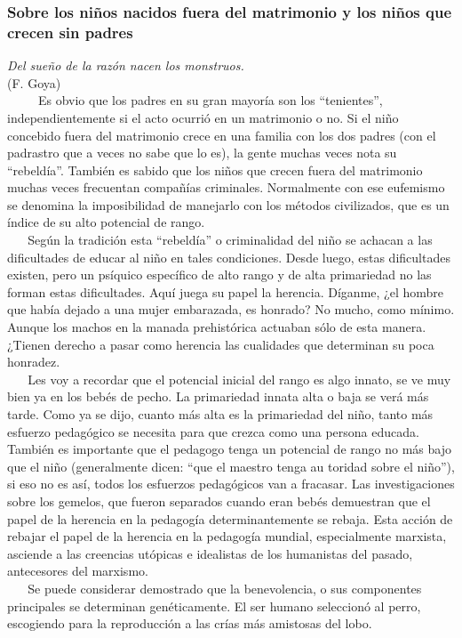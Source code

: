 \protect\hypertarget{M13}{}{}

\subsubsection{Sobre los niños nacidos fuera del matrimonio y los niños que crecen sin padres}
\label{sobre-los-niuxf1os-nacidos-fuera-del-matrimonio-y-los-niuxf1os-que-crecen-sin-padres}

\noindent
\textit{Del sueño de la razón nacen los monstruos.}\\
(F. Goya)\\

~ ~ ~ Es obvio que los padres en su gran mayoría son los ``tenientes'',
independientemente si el acto ocurrió en un matrimonio o no. Si el niño
concebido fuera del matrimonio crece en una familia con los dos padres
(con el padrastro que a veces no sabe que lo es), la gente muchas veces
nota su ``rebeldía''. También es sabido que los niños que crecen fuera
del matrimonio muchas veces frecuentan compañías criminales. Normalmente
con ese eufemismo se denomina la imposibilidad de manejarlo con los
métodos civilizados, que es un índice de su alto potencial de rango.\\
\hspace*{0.333em} ~ ~ Según la tradición esta ``rebeldía'' o
criminalidad del niño se achacan a las dificultades de educar al niño en
tales condiciones. Desde luego, estas dificultades existen, pero un
psíquico específico de alto rango y de alta primariedad no las forman
estas dificultades. Aquí juega su papel la herencia. Díganme, ¿el hombre
que había dejado a una mujer embarazada, es honrado? No mucho, como
mínimo. Aunque los machos en la manada prehistórica actuaban sólo de
esta manera. ¿Tienen derecho a pasar como herencia las cualidades que
determinan su poca honradez.\\
\hspace*{0.333em} ~ ~ Les voy a recordar que el potencial inicial del
rango es algo innato, se ve muy bien ya en los bebés de pecho. La
primariedad innata alta o baja se verá más tarde. Como ya se dijo,
cuanto más alta es la primariedad del niño, tanto más esfuerzo
pedagógico se necesita para que crezca como una persona educada. También
es importante que el pedagogo tenga un potencial de rango no más bajo
que el niño (generalmente dicen: ``que el maestro tenga au toridad sobre
el niño''), si eso no es así, todos los esfuerzos pedagógicos van a
fracasar. Las investigaciones sobre los gemelos, que fueron separados
cuando eran bebés demuestran que el papel de la herencia en la pedagogía
determinantemente se rebaja. Esta acción de rebajar el papel de la
herencia en la pedagogía mundial, especialmente marxista, asciende a las
creencias utópicas e idealistas de los humanistas del pasado,
antecesores del marxismo.\\
\hspace*{0.333em} ~ ~ Se puede considerar demostrado que la
benevolencia, o sus componentes principales se determinan genéticamente.
El ser humano seleccionó al perro, escogiendo para la reproducción a las
crías más amistosas del lobo.

